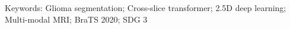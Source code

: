\vspace{0.4cm}
\noindent Keywords: Glioma segmentation; Cross-slice transformer; 2.5D deep learning; Multi-modal MRI; BraTS 2020; SDG 3


\clearpage
\tableofcontents
\clearpage
{}
{}
\listoffigures
\clearpage
{}
{}
\listoftables
\clearpage
{}
\pagestyle{plain}
\EnableProjectHeaders
